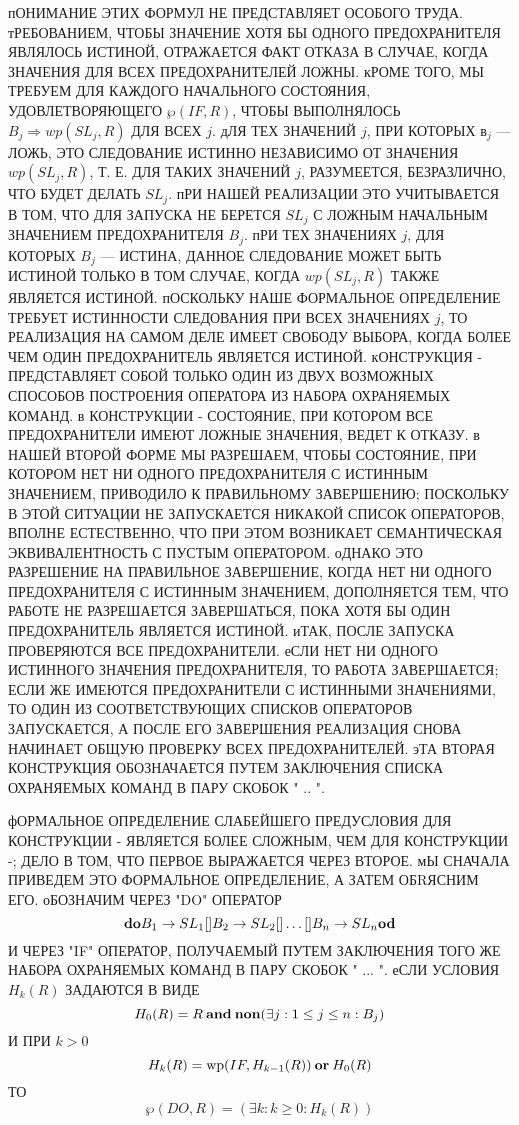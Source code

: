 пОНИМАНИЕ ЭТИХ ФОРМУЛ НЕ ПРЕДСТАВЛЯЕТ ОСОБОГО ТРУДА. 
тРЕБОВАНИЕМ, ЧТОБЫ ЗНАЧЕНИЕ ХОТЯ БЫ ОДНОГО ПРЕДОХРАНИТЕЛЯ 
ЯВЛЯЛОСЬ ИСТИНОЙ, ОТРАЖАЕТСЯ ФАКТ ОТКАЗА В СЛУЧАЕ, КОГДА 
ЗНАЧЕНИЯ ДЛЯ ВСЕХ ПРЕДОХРАНИТЕЛЕЙ ЛОЖНЫ. кРОМЕ ТОГО, МЫ 
ТРЕБУЕМ ДЛЯ КАЖДОГО НАЧАЛЬНОГО СОСТОЯНИЯ, УДОВЛЕТВОРЯЮЩЕГО 
$\wp(IF,R)$, ЧТОБЫ ВЫПОЛНЯЛОСЬ $B_j \Rightarrow wp(SL_j, R)$ ДЛЯ 
ВСЕХ $j$. дЛЯ ТЕХ ЗНАЧЕНИЙ $j$, ПРИ КОТОРЫХ $в_j$  --- 
ЛОЖЬ, ЭТО СЛЕДОВАНИЕ ИСТИННО НЕЗАВИСИМО ОТ ЗНАЧЕНИЯ 
$wp(SL_j, R)$, Т. Е. ДЛЯ ТАКИХ ЗНАЧЕНИЙ $j$, РАЗУМЕЕТСЯ, 
БЕЗРАЗЛИЧНО, ЧТО БУДЕТ ДЕЛАТЬ $SL_j$. пРИ НАШЕЙ РЕАЛИЗАЦИИ 
ЭТО УЧИТЫВАЕТСЯ В ТОМ, ЧТО ДЛЯ ЗАПУСКА НЕ БЕРЕТСЯ $SL_j$ С 
ЛОЖНЫМ НАЧАЛЬНЫМ ЗНАЧЕНИЕМ ПРЕДОХРАНИТЕЛЯ $B_j$. пРИ ТЕХ 
ЗНАЧЕНИЯХ $j$, ДЛЯ КОТОРЫХ $B_j$ --- ИСТИНА, ДАННОЕ 
СЛЕДОВАНИЕ МОЖЕТ БЫТЬ ИСТИНОЙ ТОЛЬКО В ТОМ СЛУЧАЕ, КОГДА 
$wp(SL_j,R)$ ТАКЖЕ ЯВЛЯЕТСЯ ИСТИНОЙ. пОСКОЛЬКУ НАШЕ 
ФОРМАЛЬНОЕ ОПРЕДЕЛЕНИЕ ТРЕБУЕТ ИСТИННОСТИ СЛЕДОВАНИЯ ПРИ ВСЕХ 
ЗНАЧЕНИЯХ $j$, ТО РЕАЛИЗАЦИЯ НА САМОМ ДЕЛЕ ИМЕЕТ СВОБОДУ 
ВЫБОРА, КОГДА БОЛЕЕ ЧЕМ ОДИН ПРЕДОХРАНИТЕЛЬ ЯВЛЯЕТСЯ ИСТИНОЙ. 
кОНСТРУКЦИЯ - ПРЕДСТАВЛЯЕТ СОБОЙ ТОЛЬКО ОДИН ИЗ 
ДВУХ ВОЗМОЖНЫХ СПОСОБОВ ПОСТРОЕНИЯ ОПЕРАТОРА ИЗ НАБОРА 
ОХРАНЯЕМЫХ КОМАНД. в КОНСТРУКЦИИ - СОСТОЯНИЕ, ПРИ 
КОТОРОМ ВСЕ ПРЕДОХРАНИТЕЛИ ИМЕЮТ ЛОЖНЫЕ ЗНАЧЕНИЯ, ВЕДЕТ К 
ОТКАЗУ. в НАШЕЙ ВТОРОЙ ФОРМЕ МЫ РАЗРЕШАЕМ, ЧТОБЫ СОСТОЯНИЕ, 
ПРИ КОТОРОМ НЕТ НИ ОДНОГО ПРЕДОХРАНИТЕЛЯ С ИСТИННЫМ 
ЗНАЧЕНИЕМ, ПРИВОДИЛО К ПРАВИЛЬНОМУ ЗАВЕРШЕНИЮ; ПОСКОЛЬКУ В 
ЭТОЙ СИТУАЦИИ НЕ ЗАПУСКАЕТСЯ НИКАКОЙ СПИСОК ОПЕРАТОРОВ, 
ВПОЛНЕ ЕСТЕСТВЕННО, ЧТО ПРИ ЭТОМ ВОЗНИКАЕТ СЕМАНТИЧЕСКАЯ 
ЭКВИВАЛЕНТНОСТЬ С ПУСТЫМ ОПЕРАТОРОМ. оДНАКО ЭТО РАЗРЕШЕНИЕ НА 
ПРАВИЛЬНОЕ ЗАВЕРШЕНИЕ, КОГДА НЕТ НИ ОДНОГО ПРЕДОХРАНИТЕЛЯ С 
ИСТИННЫМ ЗНАЧЕНИЕМ, ДОПОЛНЯЕТСЯ ТЕМ, ЧТО РАБОТЕ НЕ 
РАЗРЕШАЕТСЯ ЗАВЕРШАТЬСЯ, ПОКА ХОТЯ БЫ ОДИН ПРЕДОХРАНИТЕЛЬ 
ЯВЛЯЕТСЯ ИСТИНОЙ. иТАК, ПОСЛЕ ЗАПУСКА ПРОВЕРЯЮТСЯ ВСЕ 
ПРЕДОХРАНИТЕЛИ. еСЛИ  НЕТ НИ ОДНОГО ИСТИННОГО ЗНАЧЕНИЯ 
ПРЕДОХРАНИТЕЛЯ, ТО РАБОТА ЗАВЕРШАЕТСЯ; ЕСЛИ ЖЕ ИМЕЮТСЯ 
ПРЕДОХРАНИТЕЛИ С ИСТИННЫМИ ЗНАЧЕНИЯМИ, ТО ОДИН ИЗ 
СООТВЕТСТВУЮЩИХ СПИСКОВ ОПЕРАТОРОВ ЗАПУСКАЕТСЯ, А ПОСЛЕ ЕГО 
ЗАВЕРШЕНИЯ РЕАЛИЗАЦИЯ СНОВА НАЧИНАЕТ ОБЩУЮ ПРОВЕРКУ ВСЕХ 
ПРЕДОХРАНИТЕЛЕЙ. эТА ВТОРАЯ КОНСТРУКЦИЯ ОБОЗНАЧАЕТСЯ ПУТЕМ 
ЗАКЛЮЧЕНИЯ СПИСКА ОХРАНЯЕМЫХ КОМАНД В ПАРУ СКОБОК " .. ".

фОРМАЛЬНОЕ ОПРЕДЕЛЕНИЕ СЛАБЕЙШЕГО ПРЕДУСЛОВИЯ ДЛЯ  
КОНСТРУКЦИИ - ЯВЛЯЕТСЯ БОЛЕЕ СЛОЖНЫМ, ЧЕМ ДЛЯ 
КОНСТРУКЦИИ -; ДЕЛО В ТОМ, ЧТО ПЕРВОЕ ВЫРАЖАЕТСЯ ЧЕРЕЗ 
ВТОРОЕ. мЫ СНАЧАЛА ПРИВЕДЕМ ЭТО ФОРМАЛЬНОЕ ОПРЕДЕЛЕНИЕ, А 
ЗАТЕМ ОБRЯСНИМ ЕГО. оБОЗНАЧИМ ЧЕРЕЗ "DO" ОПЕРАТОР
$$ 
 \kwd{do} B_1\to SL_1\wbox  B_2\to SL_2 \wbox \ldots \wbox 
B_n \to SL_n \kwd{od} 
$$
И ЧЕРЕЗ "IF" ОПЕРАТОР, ПОЛУЧАЕМЫЙ ПУТЕМ ЗАКЛЮЧЕНИЯ ТОГО ЖЕ 
НАБОРА ОХРАНЯЕМЫХ КОМАНД В ПАРУ СКОБОК " ... ". еСЛИ  
УСЛОВИЯ $H_k(R)$ ЗАДАЮТСЯ В ВИДЕ 
$$ 
H_0(R)=R \mathbin{\bf and} \mathop{\bf non}\nolimits (\exists j: 1\le j \le n : B_j) 
$$
И ПРИ $k>0$
$$ 
H_k(R)=\mathop{\rm wp}\nolimits(IF, H_{k-1} (R)) \mathbin{\bf or} H_0(R) 
$$ 
ТО
$$ 
\wp(DO,R) = (\exists k: k\ge 0 : H_k(R)) 
$$

